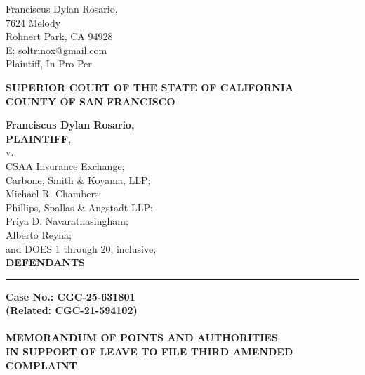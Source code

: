 

\nolinenumbers
\begin{singlespace}
Franciscus Dylan Rosario, \\
7624 Melody \\
Rohnert Park, CA 94928 \\
E: soltrinox@gmail.com \\
Plaintiff, In Pro Per \\
\end{singlespace}
\vspace*{9mm}
\begin{tightcenter}
\textbf{SUPERIOR COURT OF THE STATE OF CALIFORNIA} \\
\textbf{COUNTY OF SAN FRANCISCO}
\end{tightcenter}
\vspace*{2.25mm}
\nolinenumbers
\begin{minipage}[t]{3in}
    \raggedright
    \textbf{Franciscus Dylan Rosario,} \\ \textbf{PLAINTIFF}, \\
    \hspace{1cm} v. \\
    \small
    CSAA Insurance Exchange; \\
    Carbone, Smith \& Koyama, LLP; \\
    Michael R. Chambers; \\
    Phillips, Spallas \& Angstadt LLP; \\
    Priya D. Navaratnasingham; \\
    Alberto Reyna; \\
    and DOES 1 through 20, inclusive; \\
    \normalsize
    \textbf{DEFENDANTS}
    \makebox[3in]{\hrulefill}
\end{minipage}%
\hspace{3mm}
\begin{minipage}[t]{0.5pt}
    \vspace{0pt}
    \rule{0.5pt}{3.1in}
\end{minipage}
\hspace{3mm}
\begin{minipage}[t]{3in}
    \raggedright
    \noindent \textbf{Case No.: CGC-25-631801} \\
    \textbf{(Related: CGC-21-594102)} \\
    ~\\
    \textbf{MEMORANDUM OF POINTS AND AUTHORITIES} \\
    \textbf{IN SUPPORT OF LEAVE TO FILE THIRD AMENDED COMPLAINT}
\end{minipage}
